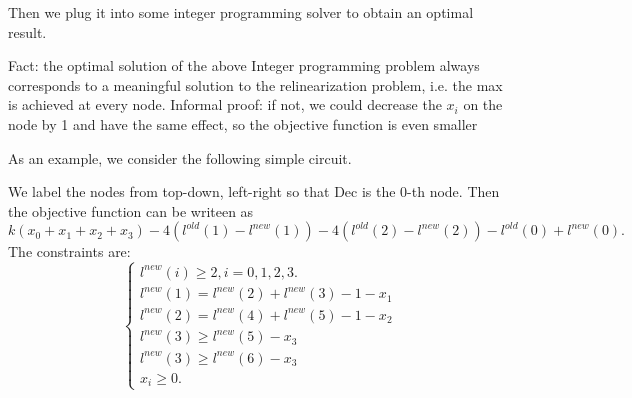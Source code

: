 \documentclass[11pt]{article} %
\theoremstyle{plain}
\theoremstyle{definition}
\begin{document}




Then we plug it into some integer programming solver to obtain an optimal result. 

Fact: the optimal solution of the above Integer programming problem always corresponds to a meaningful solution to the relinearization problem, i.e. the max is achieved at every node. Informal proof: if not, we could decrease the $x_i$ on the node by 1 and have the same effect, so the objective function is even smaller

As an example, we consider the following simple circuit. 
\begin{center}
\end{center}

We label the nodes from top-down, left-right so that Dec is the 0-th node. Then the objective function 
can be writeen as 
\[
	k(x_0 + x_1 + x_2 + x_3 )  - 4( l^{old}(1) - l^{new}(1) )  -  4( l^{old}(2) - l^{new}(2) )  -  l^{old}(0) + l^{new}(0). 
\]	
The constraints are:  \\
\[
\begin{cases}
l^{new}(i) \geq 2,  i  = 0,1,2,3.  \\
l^{new}(1) = l^{new}(2) + l^{new}(3) -1 - x_1 \\
l^{new}(2) = l^{new}(4) + l^{new}(5) -1 - x_2 \\
l^{new}(3) \geq l^{new}(5) - x_3 \\ 
l^{new}(3) \geq l^{new}(6) - x_3 \\
x_i \geq 0. 
\end{cases}
\]
\end{document}
